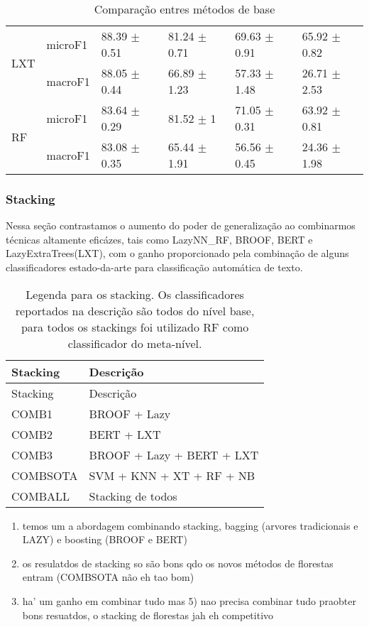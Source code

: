 \documentclass[]{book}
\begin{document}
\begin{table}[ht]
\begin{tabular}{llllll}
   \cline{3-6}\multirow{2}{*}{LXT} & microF1 & 88.39 $\pm$  0.51 & 81.24 $\pm$  0.71 & 69.63 $\pm$  0.91 & 65.92 $\pm$  0.82 \\ 
   & macroF1 & 88.05 $\pm$  0.44 & 66.89 $\pm$  1.23 & 57.33 $\pm$  1.48 & 26.71 $\pm$  2.53 \\ 
   \cline{3-6}\multirow{2}{*}{RF} & microF1 & 83.64 $\pm$  0.29 & 81.52 $\pm$  1 & 71.05 $\pm$  0.31 & 63.92 $\pm$  0.81 \\ 
   & macroF1 & 83.08 $\pm$  0.35 & 65.44 $\pm$  1.91 & 56.56 $\pm$  0.45 & 24.36 $\pm$  1.98 \\ 
   \cline{3-6}\end{tabular}
\caption{Comparação entres métodos de base} 
\label{tab:base}
\end{table}

\subsubsection{Stacking}\label{stacking-1}

Nessa seção contrastamos o aumento do poder de generalização ao
combinarmos técnicas altamente eficázes, tais como LazyNN\_RF, BROOF,
BERT e LazyExtraTrees(LXT), com o ganho proporcionado pela combinação de
alguns classificadores estado-da-arte para classificação automática de
texto.

\begin{longtable}[c]{@{}ll@{}}
\caption{Legenda para os stacking. Os classificadores reportados na
descrição são todos do nível base, para todos os stackings foi utilizado
RF como classificador do meta-nível.}\tabularnewline
\toprule
Stacking & Descrição\tabularnewline
\midrule
\endfirsthead
\toprule
Stacking & Descrição\tabularnewline
\midrule
\endhead
COMB1 & BROOF + Lazy\tabularnewline
COMB2 & BERT + LXT\tabularnewline
COMB3 & BROOF + Lazy + BERT + LXT\tabularnewline
COMBSOTA & SVM + KNN + XT + RF + NB\tabularnewline
COMBALL & Stacking de todos\tabularnewline
\bottomrule
\end{longtable}

\begin{enumerate}
\def\labelenumi{\arabic{enumi})}
\setcounter{enumi}{1}
\itemsep1pt\parskip0pt
\item
  temos um a abordagem combinando stacking, bagging (arvores
  tradicionais e LAZY) e boosting (BROOF e BERT)
\item
  os resulatdos de stacking so são bons qdo os novos métodos de
  florestas entram (COMBSOTA não eh tao bom)
\item
  ha' um ganho em combinar tudo mas 5) nao precisa combinar tudo
  praobter bons resuatdos, o stacking de florestas jah eh competitivo
\end{enumerate}
\end{document}

